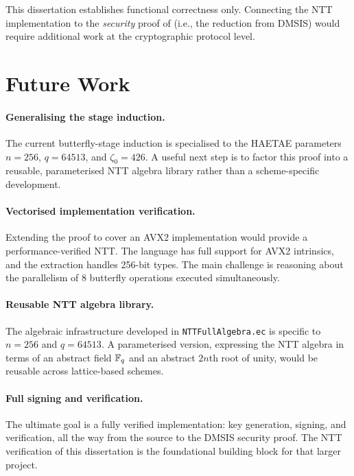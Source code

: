 This dissertation establishes functional correctness only.  Connecting the
NTT implementation to the \emph{security} proof of \haetae{} (i.e., the
reduction from DMSIS) would require additional work at the cryptographic
protocol level.

\section{Future Work}

\paragraph{Generalising the stage induction.}
The current butterfly-stage induction is specialised to the HAETAE parameters
\(n=256\), \(q=64513\), and \(\zeta_0=426\).  A useful next step is to
factor this proof into a reusable, parameterised NTT algebra library rather
than a scheme-specific development.

\paragraph{Vectorised implementation verification.}
Extending the proof to cover an AVX2 implementation would provide a
performance-verified \haetae{} NTT.  The \jasmin{} language has full support
for AVX2 intrinsics, and the \easycrypt{} extraction handles 256-bit types.
The main challenge is reasoning about the parallelism of 8 butterfly
operations executed simultaneously.

\paragraph{Reusable NTT algebra library.}
The algebraic infrastructure developed in \texttt{NTTFullAlgebra.ec} is
specific to $n = 256$ and $q = 64513$.  A parameterised version, expressing
the NTT algebra in terms of an abstract field $\mathbb{F}_q$ and an abstract
$2n$th root of unity, would be reusable across lattice-based schemes.

\paragraph{Full \haetae{} signing and verification.}
The ultimate goal is a fully verified \haetae{} implementation: key generation,
signing, and verification, all the way from the \jasmin{} source to the
DMSIS security proof.  The NTT verification of this dissertation is the
foundational building block for that larger project.

